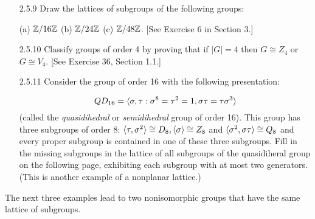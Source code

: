 \begin{enumerate}
                  (a) $S_3$ \qquad (b) $Q_8$.
   \item[2.5.9]   Draw the lattices of subgroups of the following groups:

                  (a) $\mathbb{Z}/16\mathbb{Z}$ \qquad (b) $\mathbb{Z}/24\mathbb{Z}$ \qquad
                  (c) $\mathbb{Z}/48\mathbb{Z}$. [See Exercise 6 in Section 3.]
   \item[2.5.10]  Classify groups of order 4 by proving that if $|G| = 4$ then
                  $G \cong Z_4$ or $G\cong V_4$. [See Exercise 36, Section 1.1.]
   \item[2.5.11]  Consider the group of order 16 with the following
                  presentation:

                  $$QD_{16} = \langle \sigma, \tau : \sigma^8 = \tau^2 = 1,
                    \sigma\tau = \tau\sigma^3 \rangle$$
                  (called the \textit{quasidihedral} or \textit{semidihedral}
                  group of order 16). This group has three subgroups of order 8:
                  $\langle \tau, \sigma^2 \rangle \cong D_8, \langle \sigma \rangle \cong Z_8$ and
                  $\langle \sigma^2, \sigma\tau \rangle \cong Q_8$ and every proper
                  subgroup is contained in one of these three subgroups. Fill in
                  the missing subgroups in the lattice of all subgroups of the 
                  quasidiheral group on the following page, exhibiting each
                  subgroup with at most two generators. (This is another example
                  of a nonplanar lattice.)
\end{enumerate}

\noindent The next three examples lead to two nonisomorphic groups that have the 
          same lattice of subgroups.

